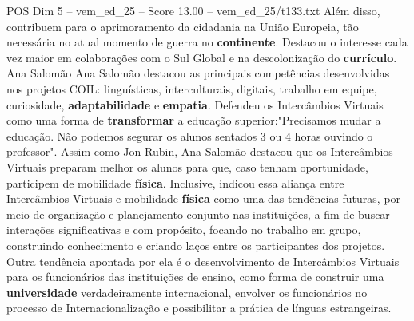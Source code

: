 \begin{textsample}{POS Dim 5 – vem\_ed\_25 – Score 13.00 – vem\_ed\_25/t133.txt}
Além disso, contribuem para o aprimoramento da cidadania na União Europeia, tão necessária no atual momento de guerra no \textbf{continente}.
Destacou o interesse cada vez maior em colaborações com o Sul Global e na descolonização do \textbf{currículo}.
Ana Salomão Ana Salomão destacou as principais competências desenvolvidas nos projetos COIL: linguísticas, interculturais, digitais, trabalho em equipe, curiosidade, \textbf{adaptabilidade} e \textbf{empatia}.
Defendeu os Intercâmbios Virtuais como uma forma de \textbf{transformar} a educação superior:"Precisamos mudar a educação.
Não podemos segurar os alunos sentados 3 ou 4 horas ouvindo o professor".
Assim como Jon Rubin, Ana Salomão destacou que os Intercâmbios Virtuais preparam melhor os alunos para que, caso tenham oportunidade, participem de mobilidade \textbf{física}.
Inclusive, indicou essa aliança entre Intercâmbios Virtuais e mobilidade \textbf{física} como uma das tendências futuras, por meio de organização e planejamento conjunto nas instituições, a fim de buscar interações significativas e com propósito, focando no trabalho em grupo, construindo conhecimento e criando laços entre os participantes dos projetos.
Outra tendência apontada por ela é o desenvolvimento de Intercâmbios Virtuais para os funcionários das instituições de ensino, como forma de construir uma \textbf{universidade} verdadeiramente internacional, envolver os funcionários no processo de Internacionalização e possibilitar a prática de línguas estrangeiras.

\end{textsample}
